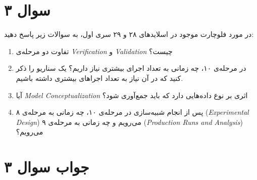 \section*{سوال ۳}

در مورد فلوچارت موجود در اسلاید‌های ۲۸ و ۲۹ سری اول، به سوالات زیر پاسخ دهید:

\begin{enumerate}[الف]
	\item تفاوت دو مرحله‌ی \textit{Verification} و \textit{Validation} چیست؟
	\item در مرحله‌ی ۱۰، چه زمانی به تعداد اجرای بیشتری نیاز داریم؟ یک سناریو را ذکر کنید که در آن نیاز به تعداد اجراهای بیشتری داشته باشیم.
	\item آیا \textit{Model Conceptualization} اثری بر نوع داده‌هایی دارد که باید جمع‌آوری شود؟
	\item پس از انجام شبیه‌سازی در مرحله‌ی ۱۰، چه زمانی به مرحله‌ی ۸ 
	(\textit{Experimental Design}) می‌رویم 
	و چه زمانی به مرحله‌ی ۹
	(\textit{Production Runs and Analysis}) می‌رویم؟
\end{enumerate}

\section*{جواب سوال ۳}

